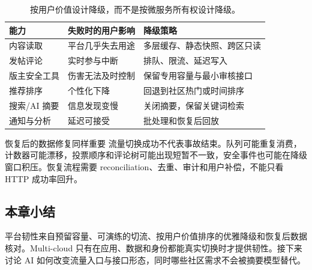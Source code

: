\begin{table}[H]
\centering
\begin{tabular}{L{0.19\textwidth}L{0.31\textwidth}L{0.4\textwidth}}
\toprule
能力 & 失败时的用户影响 & 降级策略 \\
\midrule
内容读取 & 平台几乎失去用途 & 多层缓存、静态快照、跨区只读 \\
发帖评论 & 实时参与中断 & 排队、限流、延迟写入 \\
版主安全工具 & 伤害无法及时控制 & 保留专用容量与最小审核接口 \\
推荐排序 & 个性化下降 & 回退到社区热门或时间排序 \\
搜索/AI 摘要 & 信息发现变慢 & 关闭摘要，保留关键词检索 \\
通知与分析 & 延迟可接受 & 批处理和恢复后回放 \\
\bottomrule
\end{tabular}
\caption{按用户价值设计降级，而不是按微服务所有权设计降级。}
\end{table}

\begin{warningbox}{恢复后的数据修复同样重要}
流量切换成功不代表事故结束。队列可能重复消费，计数器可能漂移，投票顺序和评论树可能出现短暂不一致，安全事件也可能在降级窗口积压。恢复流程需要 reconciliation、去重、审计和用户补偿，不能只看 HTTP 成功率回升。
\end{warningbox}

\subsection{本章小结}

平台韧性来自预留容量、可演练的切流、按用户价值排序的优雅降级和恢复后数据核对。Multi-cloud 只有在应用、数据和身份都能真实切换时才提供韧性。接下来讨论 AI 如何改变流量入口与接口形态，同时哪些社区需求不会被摘要模型替代。

